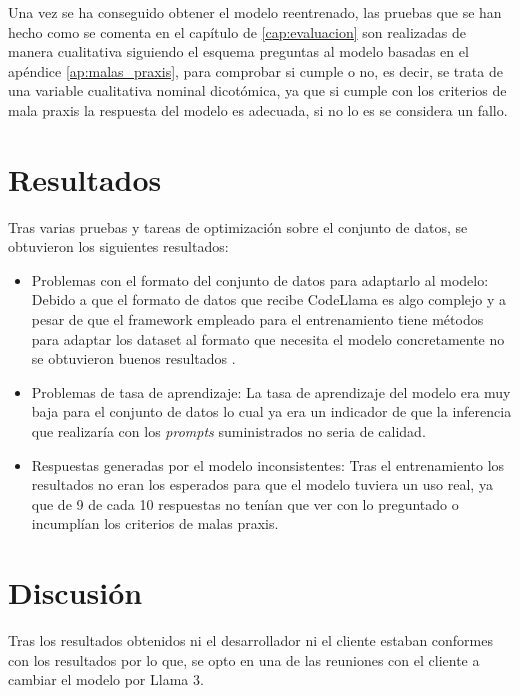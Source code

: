 Una vez se ha conseguido obtener el modelo reentrenado, las pruebas que se han hecho como se comenta en el capítulo de \ref{cap:evaluacion} son realizadas de manera cualitativa siguiendo el esquema preguntas al modelo basadas en el apéndice \ref{ap:malas_praxis}, para comprobar si cumple o no, es decir, se trata de una variable cualitativa nominal dicotómica, ya que si cumple con los criterios de mala praxis la respuesta del modelo es adecuada, si no lo es  se considera un fallo.

\section{Resultados}

Tras varias pruebas y tareas de optimización sobre el conjunto de datos, se obtuvieron los siguientes resultados:

\begin{itemize}
    \item Problemas con el formato del conjunto de datos para adaptarlo al modelo: Debido a que el formato de datos que recibe CodeLlama es algo complejo y  a pesar de que el framework empleado para el entrenamiento tiene métodos para adaptar los dataset al formato que necesita el modelo concretamente no se obtuvieron buenos resultados \cite{formatoLlama2}.

    \item Problemas de tasa de aprendizaje: La tasa de aprendizaje del modelo era muy baja para el conjunto de datos lo cual ya era un indicador de que la inferencia que realizaría con los \textit{prompts} suministrados no seria de calidad.

    \item Respuestas generadas por el modelo inconsistentes: Tras el entrenamiento los resultados no eran los esperados para que el modelo tuviera un uso real, ya que de 9 de cada 10 respuestas no tenían que ver con lo preguntado o incumplían los criterios de malas praxis.
\end{itemize}

\section{Discusión}

Tras los resultados obtenidos ni el desarrollador ni el cliente estaban conformes con los resultados por lo que, se opto en una de las reuniones con el cliente a cambiar el modelo por Llama 3.